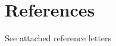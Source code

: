 \documentclass[11pt,a4paper,sans]{moderncv}        %
\begin{document}
\section{References}
See attached reference letters

%



\end{document}
